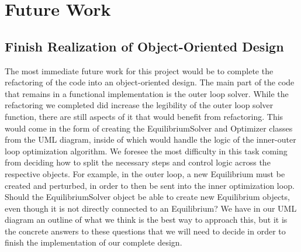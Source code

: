 \documentclass{article}
\begin{document}
\section{Future Work}

\subsection{Finish Realization of Object-Oriented Design}
The most immediate future work for this project would be to complete the refactoring of the code into an object-oriented design.
The main part of the code that remains in a functional implementation is the outer loop solver.
While the refactoring we completed did increase the legibility of the outer loop solver function, there are still aspects of it that would benefit from refactoring.
This would come in the form of creating the EquilibriumSolver and Optimizer classes from the UML diagram, inside of which would handle the logic of the inner-outer loop optimization algorithm.
We foresee the most difficulty in this task coming from deciding how to split the necessary steps and control logic across the respective objects.
For example, in the outer loop, a new Equilibrium must be created and perturbed, in order to then be sent into the inner optimization loop.
Should the EquilibriumSolver object be able to create new Equilibrium objects, even though it is not directly connected to an Equilibrium?
We have in our UML diagram an outline of what we think is the best way to approach this, but it is the concrete answers to these questions that we will need to decide in order to finish the implementation of our complete design.





\end{document}
